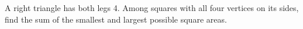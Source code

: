 A right triangle has both legs 4. Among squares with all four vertices on its sides, find the sum of the smallest and largest possible square areas.
